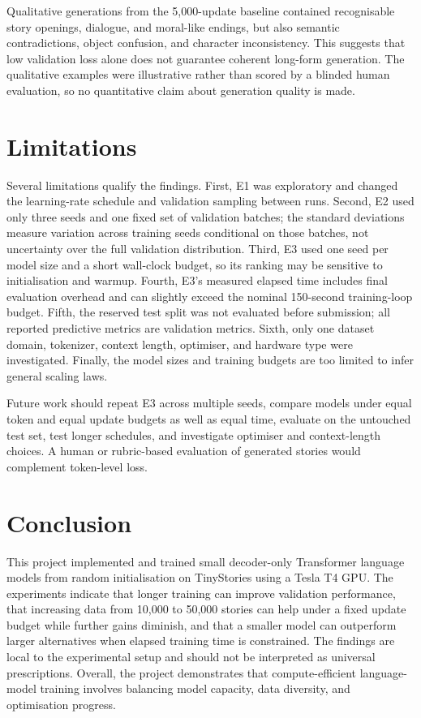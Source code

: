 \documentclass[10pt,a4paper]{article}
\begin{document}
Qualitative generations from the 5,000-update baseline contained recognisable story openings, dialogue, and moral-like endings, but also semantic contradictions, object confusion, and character inconsistency. This suggests that low validation loss alone does not guarantee coherent long-form generation. The qualitative examples were illustrative rather than scored by a blinded human evaluation, so no quantitative claim about generation quality is made.

\section{Limitations}
Several limitations qualify the findings. First, E1 was exploratory and changed the learning-rate schedule and validation sampling between runs. Second, E2 used only three seeds and one fixed set of validation batches; the standard deviations measure variation across training seeds conditional on those batches, not uncertainty over the full validation distribution. Third, E3 used one seed per model size and a short wall-clock budget, so its ranking may be sensitive to initialisation and warmup. Fourth, E3's measured elapsed time includes final evaluation overhead and can slightly exceed the nominal 150-second training-loop budget. Fifth, the reserved test split was not evaluated before submission; all reported predictive metrics are validation metrics. Sixth, only one dataset domain, tokenizer, context length, optimiser, and hardware type were investigated. Finally, the model sizes and training budgets are too limited to infer general scaling laws.

Future work should repeat E3 across multiple seeds, compare models under equal token and equal update budgets as well as equal time, evaluate on the untouched test set, test longer schedules, and investigate optimiser and context-length choices. A human or rubric-based evaluation of generated stories would complement token-level loss.

\section{Conclusion}
This project implemented and trained small decoder-only Transformer language models from random initialisation on TinyStories using a Tesla T4 GPU. The experiments indicate that longer training can improve validation performance, that increasing data from 10,000 to 50,000 stories can help under a fixed update budget while further gains diminish, and that a smaller model can outperform larger alternatives when elapsed training time is constrained. The findings are local to the experimental setup and should not be interpreted as universal prescriptions. Overall, the project demonstrates that compute-efficient language-model training involves balancing model capacity, data diversity, and optimisation progress.
\end{document}
